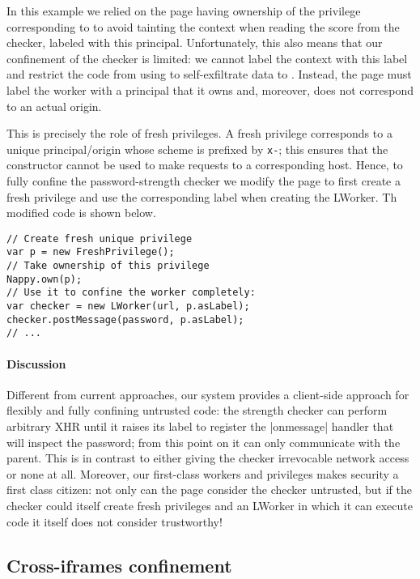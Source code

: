 %
In this example we relied on the page having ownership of the
privilege corresponding to  to avoid tainting the
context when reading the score from the checker, labeled with this
principal.
%
Unfortunately, this also means that our confinement of the checker is
limited: we cannot label the context with this label and restrict the
code from using \xhr{} to self-exfiltrate data to .
%
Instead, the page must label the worker with a principal that it owns
and, moreover, does not correspond to an actual origin.

This is precisely the role of fresh privileges.
%
A fresh privilege corresponds to a unique principal/origin whose
scheme is prefixed by \texttt{x-}; this ensures that the \xhr{}
constructor cannot be used to make requests to a corresponding host.
%
Hence, to fully confine the password-strength checker we modify the
 page to first create a fresh privilege and use the
corresponding label when creating the LWorker.
%
Th modified code is shown below.
\begin{lstlisting}
// Create fresh unique privilege
var p = new FreshPrivilege();
// Take ownership of this privilege
Nappy.own(p);
// Use it to confine the worker completely:
var checker = new LWorker(url, p.asLabel);
checker.postMessage(password, p.asLabel);
// ...
\end{lstlisting}
%

%
\paragraph{Discussion}
Different from current approaches, our system provides a client-side
approach for flexibly and fully confining untrusted code:
%
the strength checker can perform arbitrary XHR until it raises its
label to register the \js|onmessage| handler that will inspect the
password; from this point on it can only communicate with the parent.
%
This is in contrast to either giving the checker irrevocable network
access or none at all.
%
Moreover, our first-class workers and privileges makes security a
first class citizen: not only can the page consider the checker
untrusted, but if the checker could itself create fresh privileges and
an LWorker in which it can execute code it itself does not consider
trustworthy!

\subsection{Cross-iframes confinement}
\label{sec:system:iframe}

